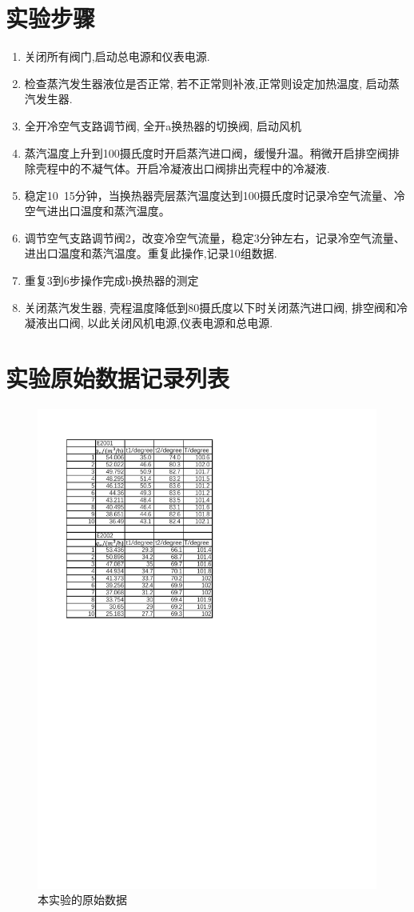 \documentclass[a4paper,UTF8]{ctexrep}
\theoremstyle{plain}
\theoremstyle{definition}
\numberwithin{equation}{chapter}
\begin{document}
        \section{实验步骤}

        \begin{enumerate}
            \item 关闭所有阀门,启动总电源和仪表电源.
            \item 检查蒸汽发生器液位是否正常, 若不正常则补液,正常则设定加热温度, 启动蒸汽发生器.
            \item 全开冷空气支路调节阀, 全开a换热器的切换阀, 启动风机
            \item 蒸汽温度上升到100摄氏度时开启蒸汽进口阀，缓慢升温。稍微开启排空阀排除壳程中的不凝气体。开启冷凝液出口阀排出壳程中的冷凝液. 
            \item 稳定10~15分钟，当换热器壳层蒸汽温度达到100摄氏度时记录冷空气流量、冷空气进出口温度和蒸汽温度。
            \item 调节空气支路调节阀2，改变冷空气流量，稳定3分钟左右，记录冷空气流量、进出口温度和蒸汽温度。重复此操作,记录10组数据. 
            \item 重复3到6步操作完成b换热器的测定
            \item 关闭蒸汽发生器, 壳程温度降低到80摄氏度以下时关闭蒸汽进口阀, 排空阀和冷凝液出口阀, 以此关闭风机电源,仪表电源和总电源. 
        \end{enumerate}
\newpage
        \section{实验原始数据记录列表}

        \begin{figure}[h]
            \centering
            \includegraphics[width=0.7\linewidth]{7th_orig.pdf}
            \caption{本实验的原始数据}
            \label{fig:enter-label}
        \end{figure}
        
\end{document}
